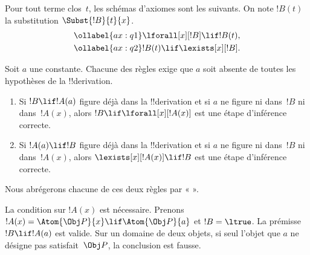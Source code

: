 \documentclass[../../../include/open-logic-section]{subfiles}
\begin{document}


\begin{defn}
Pour tout terme clos~$t$, les schémas d'axiomes sont les suivants.
On note $!B(t)$ la substitution $\Subst{!B}{t}{x}$.
\begin{align}
\ollabel{ax:q1} & \lforall[x][!B] \lif !B(t), \\
\ollabel{ax:q2} & !B(t) \lif \lexists[x][!B].
\end{align}
\end{defn}

\begin{defn}
Soit $a$ une constante. Chacune des règles exige que $a$ soit absente
de toutes les hypothèses de la !!{derivation}.
\begin{enumerate}
\item Si $!B \lif !A(a)$ figure déjà dans la !!{derivation} et si $a$
  ne figure ni dans~$!B$ ni dans~$!A(x)$, alors
  $!B \lif \lforall[x][!A(x)]$ est une étape d'inférence correcte.
\item Si $!A(a) \lif !B$ figure déjà dans la !!{derivation} et si $a$
  ne figure ni dans~$!B$ ni dans~$!A(x)$, alors
  $\lexists[x][!A(x)] \lif !B$ est une étape d'inférence correcte.
\end{enumerate}
\end{defn}

Nous abrégerons chacune de ces deux règles par « \QR{} ».

\begin{explain}
La condition sur $!A(x)$ est nécessaire. Prenons
$!A(x)=\Atom{\Obj P}{x}\lif\Atom{\Obj P}{a}$ et $!B=\ltrue$.
La prémisse $!B\lif !A(a)$ est valide. Sur un domaine de deux objets,
si seul l'objet que $a$ ne désigne pas satisfait~$\Obj P$, la conclusion est fausse.
\end{explain}
\end{document}
